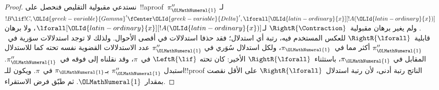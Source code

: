\documentclass[../../../include/open-logic-section]{subfiles}
\begin{document}
\begin{proof}
نستدعي مقبولية التقليص فنحصل على~!!a{proof}~$\pi_\OLMathNumeral{1}''$ لـ
$!B \lif !C, \OLId{greek-variable}{Gamma}' \fCenter \OLId{greek-variable}{Delta}', \lforall[\OLId{latin-ordinary}{x}][!A(\OLId{latin-ordinary}{x})]$. ولم
يغير برهان مقبولية~$\RightR{\Contraction}$ لـ$\lforall[\OLId{latin-ordinary}{x}][!A(\OLId{latin-ordinary}{x})]$،
ولا برهان قابلية~$\RightR{\lforall}$ للعكس المستخدم فيه، رتبة أي
استدلال؛ فقد حذفا استدلالات في أقصى الأحوال. ولذلك لا توجد استدلالات
سوَرية في~$\pi_\OLMathNumeral{1}''$ أكثر مما في~$\pi_\OLMathNumeral{1}$، ولكل استدلال سُوَري في
$\pi_\OLMathNumeral{1}''$ عدد الاستدلالات القضوية نفسه تحته كما للاستدلال المقابل في
$\pi_\OLMathNumeral{1}$، باستثناء~$\RightR{\lforall}$ الأخير: كان تحته
$\LeftR{\lif}$ في~$\pi$، وقد نقلناه إلى فوقه في~$\pi_\OLMathNumeral{1}''$. استبدل
$\pi_\OLMathNumeral{1}''$ بـ$\pi_\OLMathNumeral{1}$ في~$\pi$. ويكون للـ!!{proof} الناتج رتبة أدنى،
لأن رتبة استدلال~$\RightR{\lforall}$ على الأقل نقصت بمقدار~$\OLMathNumeral{1}$. ثم
طبّق فرض الاستقراء.


\end{proof}
\end{document}
